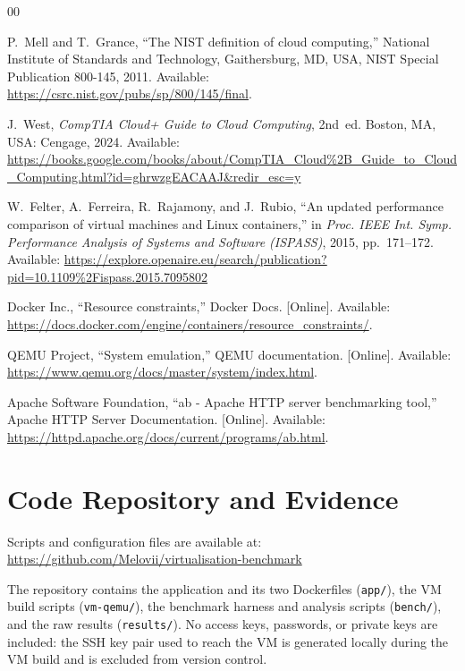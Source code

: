 \documentclass[conference,a4paper]{IEEEtran}
\begin{document}
\begin{thebibliography}{00}

 P.~Mell and T.~Grance, ``The NIST definition of cloud computing,'' National Institute of Standards and Technology, Gaithersburg, MD, USA, NIST Special Publication 800-145, 2011. Available:
\url{https://csrc.nist.gov/pubs/sp/800/145/final}.

 J.~West, \textit{CompTIA Cloud+ Guide to Cloud Computing}, 2nd~ed. Boston, MA, USA: Cengage, 2024. Available:
\url{https://books.google.com/books/about/CompTIA_Cloud%2B_Guide_to_Cloud_Computing.html?id=ghrwzgEACAAJ&redir_esc=y}

 W.~Felter, A.~Ferreira, R.~Rajamony, and J.~Rubio, ``An updated performance comparison of virtual machines and Linux containers,'' in \textit{Proc. IEEE Int. Symp. Performance Analysis of Systems and Software (ISPASS)}, 2015, pp.~171--172. Available:
\url{https://explore.openaire.eu/search/publication?pid=10.1109%2Fispass.2015.7095802}

 Docker Inc., ``Resource constraints,'' Docker Docs. [Online]. Available: \url{https://docs.docker.com/engine/containers/resource_constraints/}.

 QEMU Project, ``System emulation,'' QEMU documentation. [Online]. Available: \url{https://www.qemu.org/docs/master/system/index.html}.

 Apache Software Foundation, ``ab - Apache HTTP server benchmarking tool,'' Apache HTTP Server Documentation. [Online]. Available: \url{https://httpd.apache.org/docs/current/programs/ab.html}.

\end{thebibliography}

\appendix

\section{Code Repository and Evidence}
\label{app:code}

Scripts and configuration files are available at: \url{https://github.com/Melovii/virtualisation-benchmark}

The repository contains the application and its two Dockerfiles (\texttt{app/}), the VM build scripts (\texttt{vm-qemu/}), the benchmark harness and analysis scripts (\texttt{bench/}), and the raw results (\texttt{results/}). No access keys, passwords, or private keys are included: the SSH key pair used to reach the VM is generated locally during the VM build and is excluded from version control.
\end{document}
